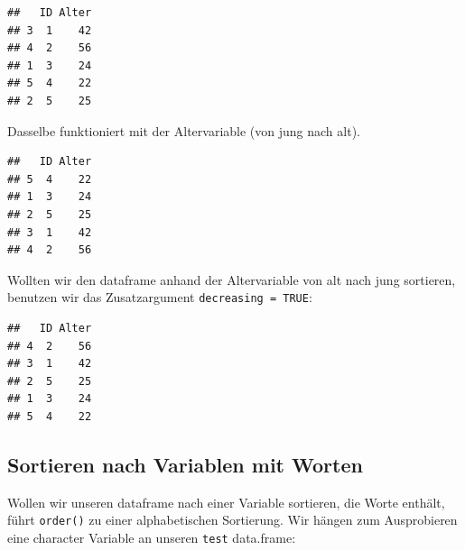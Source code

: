 \documentclass[
]{book}
\newenvironment{Shaded}{\begin{snugshade}}{\end{snugshade}}
\newcommand{\AttributeTok}[1]{\textcolor[rgb]{0.77,0.63,0.00}{#1}}
\newcommand{\CommentTok}[1]{\textcolor[rgb]{0.56,0.35,0.01}{\textit{#1}}}
\newcommand{\ConstantTok}[1]{\textcolor[rgb]{0.00,0.00,0.00}{#1}}
\newcommand{\FunctionTok}[1]{\textcolor[rgb]{0.00,0.00,0.00}{#1}}
\newcommand{\NormalTok}[1]{#1}
\newcommand{\OtherTok}[1]{\textcolor[rgb]{0.56,0.35,0.01}{#1}}
\newcommand{\SpecialCharTok}[1]{\textcolor[rgb]{0.00,0.00,0.00}{#1}}
\begin{document}
\begin{verbatim}
##   ID Alter
## 3  1    42
## 4  2    56
## 1  3    24
## 5  4    22
## 2  5    25
\end{verbatim}

Dasselbe funktioniert mit der Altervariable (von jung nach alt).

\begin{Shaded}
\end{Shaded}

\begin{verbatim}
##   ID Alter
## 5  4    22
## 1  3    24
## 2  5    25
## 3  1    42
## 4  2    56
\end{verbatim}

Wollten wir den dataframe anhand der Altervariable von alt nach jung sortieren, benutzen wir das Zusatzargument \texttt{decreasing\ =\ TRUE}:

\begin{Shaded}
\end{Shaded}

\begin{verbatim}
##   ID Alter
## 4  2    56
## 3  1    42
## 2  5    25
## 1  3    24
## 5  4    22
\end{verbatim}

\hypertarget{sortieren-nach-variablen-mit-worten}{%
\subsection{Sortieren nach Variablen mit Worten}\label{sortieren-nach-variablen-mit-worten}}

Wollen wir unseren dataframe nach einer Variable sortieren, die Worte enthält, führt \texttt{order()} zu einer alphabetischen Sortierung. Wir hängen zum Ausprobieren eine character Variable an unseren \texttt{test} data.frame:
\end{document}
